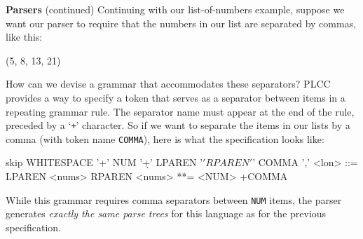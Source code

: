 \begin{minipage}[t]{\sw}
\slidenumber
\LARGE
{\bf Parsers} (continued)\exx
Continuing with our list-of-numbers example,
suppose we want our parser to require that the numbers in our list
are separated by commas, like this:
\Large
\begin{qv}
(5, 8, 13, 21)
\end{qv}
\LARGE
How can we devise a grammar that accommodates these separators?\exx
PLCC provides a way to specify a token
that serves as a separator between items
in a repeating grammar rule.
The separator name must appear at the end of the rule,
preceded by a `\verb'+'' character.
So if we want to separate the items in our lists by a comma
(with token name \verb'COMMA'),
here is what the specification looks like:
\Large
\begin{qv}
skip WHITESPACE '\s+'
NUM '\d+'
LPAREN '\('
RPAREN '\)'
COMMA ','
%
<lon>  ::= LPAREN <nums> RPAREN
<nums> **= <NUM> +COMMA
%
\end{qv}
\LARGE
While this grammar requires comma separators between \verb'NUM' items,
the parser generates {\em exactly the same parse trees}
for this language as for the previous specification.\exx
\end{minipage}
\clearpage
